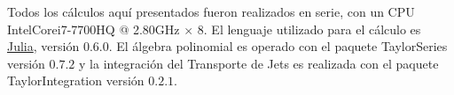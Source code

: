 Todos los cálculos aquí presentados fueron realizados en serie, con un CPU Intel\textregistered  Core\texttrademark  i7-7700HQ @ 2.80GHz $\times$ 8. El lenguaje utilizado para el cálculo es \href{julialang.org}{\textsf{Julia}}, versión $0.6.0$. El álgebra polinomial es operado con el paquete \textsf{TaylorSeries} \cite{TaylorIntegration} versión $0.7.2$ y la integración del Transporte de Jets es realizada con el paquete \textsf{TaylorIntegration} \cite{TaylorIntegration} versión $0.2.1$.